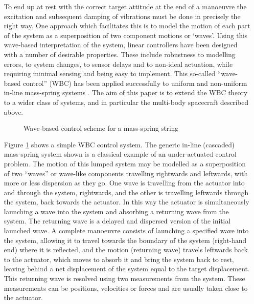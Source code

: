\documentclass{mbd_fullpaper}
\begin{document}
To end up at rest with the correct target attitude at the end of a manoeuvre the excitation and subsequent damping of vibrations must be done in precisely the right way.
One approach which facilitates this is to model the motion of each part of the system as a superposition of two component motions or ‘waves’.
Using this wave-based interpretation of the system, linear controllers have been designed with a number of desirable properties.
These include robustness to modelling errors, to system changes, to sensor delays and to non-ideal actuation, while requiring minimal sensing and being easy to implement.
This so-called “wave-based control” (WBC) has been applied successfully to uniform and non-uniform in-line mass-spring systems \cite{OConnor1998,OConnor2003,Connor2005,OConnor2011,OConnor2009}.
The aim of this paper is to extend the WBC theory to a wider class of systems, and in particular the multi-body spacecraft described above.

\begin{figure}[h]
  \begin{center}
    	
	\caption{Wave-based control scheme for a mass-spring string \label{fig:wave-based-control}}
  \end{center}
\end{figure}
Figure \ref{fig:wave-based-control} shows a simple WBC control system.
The generic in-line (cascaded) mass-spring system shown is a classical example of an under-actuated control problem.
The motion of this lumped system may be modelled as a superposition of two “waves” or wave-like components travelling rightwards and leftwards, with more or less dispersion as they go.
One wave is travelling from the actuator into and through the system, rightwards, and the other is travelling leftwards through the system, back towards the actuator.
In this way the actuator is simultaneously launching a wave into the system and absorbing a returning wave from the system.
The returning wave is a delayed and dispersed version of the initial launched wave.
A complete manoeuvre consists of launching a specified wave into the system, allowing it to travel towards the boundary of the system (right-hand end) where it is reflected, and the motion (returning wave) travels leftwards back to the actuator, which moves to absorb it and bring the system back to rest, leaving behind a net displacement of the system equal to the target displacement.
This returning wave is resolved using two measurements from the system.
These measurements can be positions, velocities or forces and are usually taken close to the actuator. 
\end{document}
